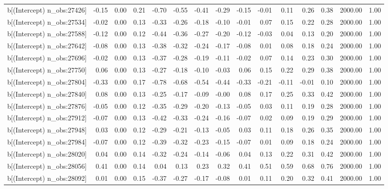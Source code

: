 \begin{table}[ht]
\begin{tabular}{rrrrrrrrrrrrrrr}
  b[(Intercept) n\_obs:27426] & -0.15 & 0.00 & 0.21 & -0.70 & -0.55 & -0.41 & -0.29 & -0.15 & -0.01 & 0.11 & 0.26 & 0.38 & 2000.00 & 1.00 \\ 
  b[(Intercept) n\_obs:27534] & -0.02 & 0.00 & 0.13 & -0.33 & -0.26 & -0.18 & -0.10 & -0.01 & 0.07 & 0.15 & 0.22 & 0.28 & 2000.00 & 1.00 \\ 
  b[(Intercept) n\_obs:27588] & -0.12 & 0.00 & 0.12 & -0.44 & -0.36 & -0.27 & -0.20 & -0.12 & -0.03 & 0.04 & 0.13 & 0.20 & 2000.00 & 1.00 \\ 
  b[(Intercept) n\_obs:27642] & -0.08 & 0.00 & 0.13 & -0.38 & -0.32 & -0.24 & -0.17 & -0.08 & 0.01 & 0.08 & 0.18 & 0.24 & 2000.00 & 1.00 \\ 
  b[(Intercept) n\_obs:27696] & -0.02 & 0.00 & 0.13 & -0.37 & -0.28 & -0.19 & -0.11 & -0.02 & 0.07 & 0.14 & 0.23 & 0.30 & 2000.00 & 1.00 \\ 
  b[(Intercept) n\_obs:27750] & 0.06 & 0.00 & 0.13 & -0.27 & -0.18 & -0.10 & -0.03 & 0.06 & 0.15 & 0.22 & 0.29 & 0.38 & 2000.00 & 1.00 \\ 
  b[(Intercept) n\_obs:27804] & -0.33 & 0.00 & 0.17 & -0.78 & -0.68 & -0.54 & -0.44 & -0.33 & -0.21 & -0.11 & -0.01 & 0.10 & 2000.00 & 1.00 \\ 
  b[(Intercept) n\_obs:27840] & 0.08 & 0.00 & 0.13 & -0.25 & -0.17 & -0.09 & -0.00 & 0.08 & 0.17 & 0.25 & 0.33 & 0.42 & 2000.00 & 1.00 \\ 
  b[(Intercept) n\_obs:27876] & -0.05 & 0.00 & 0.12 & -0.35 & -0.29 & -0.20 & -0.13 & -0.05 & 0.03 & 0.11 & 0.19 & 0.28 & 2000.00 & 1.00 \\ 
  b[(Intercept) n\_obs:27912] & -0.07 & 0.00 & 0.13 & -0.42 & -0.33 & -0.24 & -0.16 & -0.07 & 0.02 & 0.09 & 0.19 & 0.29 & 2000.00 & 1.00 \\ 
  b[(Intercept) n\_obs:27948] & 0.03 & 0.00 & 0.12 & -0.29 & -0.21 & -0.13 & -0.05 & 0.03 & 0.11 & 0.18 & 0.26 & 0.35 & 2000.00 & 1.00 \\ 
  b[(Intercept) n\_obs:27984] & -0.07 & 0.00 & 0.12 & -0.39 & -0.32 & -0.23 & -0.15 & -0.07 & 0.01 & 0.09 & 0.18 & 0.24 & 2000.00 & 1.00 \\ 
  b[(Intercept) n\_obs:28020] & 0.04 & 0.00 & 0.14 & -0.32 & -0.24 & -0.14 & -0.06 & 0.04 & 0.13 & 0.22 & 0.31 & 0.42 & 2000.00 & 1.00 \\ 
  b[(Intercept) n\_obs:28056] & 0.41 & 0.00 & 0.14 & 0.04 & 0.13 & 0.23 & 0.32 & 0.41 & 0.51 & 0.59 & 0.68 & 0.76 & 2000.00 & 1.00 \\ 
  b[(Intercept) n\_obs:28092] & 0.01 & 0.00 & 0.15 & -0.37 & -0.27 & -0.17 & -0.08 & 0.01 & 0.11 & 0.20 & 0.32 & 0.41 & 2000.00 & 1.00 \\ 

\end{tabular}
\end{table}
